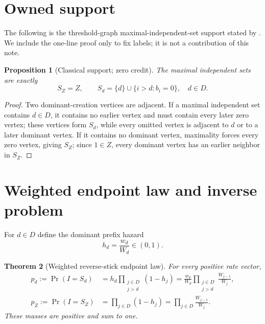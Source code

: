 \documentclass[10pt,a4paper]{amsart}
\newtheorem{theorem}{Theorem}[section]
\newtheorem{proposition}[theorem]{Proposition}
\theoremstyle{remark}
\begin{document}
\section{Owned support}

The following is the threshold-graph maximal-independent-set support stated
by \citet{klivans2007}.  We include the one-line proof only to fix labels; it
is not a contribution of this note.

\begin{proposition}[Classical support; zero credit]\label{prop:support}
The maximal independent sets are exactly
\begin{equation}\label{eq:support}
 S_Z=Z,\qquad
 S_d=\{d\}\cup\{i>d:b_i=0\},\quad d\in D.
\end{equation}
\end{proposition}

\begin{proof}
Two dominant-creation vertices are adjacent.  If a maximal independent set
contains $d\in D$, it contains no earlier vertex and must contain every later
zero vertex; these vertices form $S_d$, while every omitted vertex is adjacent
to $d$ or to a later dominant vertex.  If it contains no dominant vertex,
maximality forces every zero vertex, giving $S_Z$; since $1\in Z$, every
dominant vertex has an earlier neighbor in $S_Z$.
\end{proof}

\section{Weighted endpoint law and inverse problem}

For $d\in D$ define the dominant prefix hazard
\begin{equation}\label{eq:hazard}
 h_d=\frac{w_d}{W_d}\in(0,1).
\end{equation}

\begin{theorem}[Weighted reverse-stick endpoint law]\label{thm:stick}
For every positive rate vector,
\begin{align}
 p_d:=\Pr(I=S_d)
 &=h_d\prod_{\substack{j\in D\\j>d}}(1-h_j)
 =\frac{w_d}{W_d}\prod_{\substack{j\in D\\j>d}}
       \frac{W_{j-1}}{W_j},                       \label{eq:pd}\\
 p_Z:=\Pr(I=S_Z)
 &=\prod_{j\in D}(1-h_j)
 =\prod_{j\in D}\frac{W_{j-1}}{W_j}.             \label{eq:pz}
\end{align}
These masses are positive and sum to one.
\end{theorem}
\end{document}

